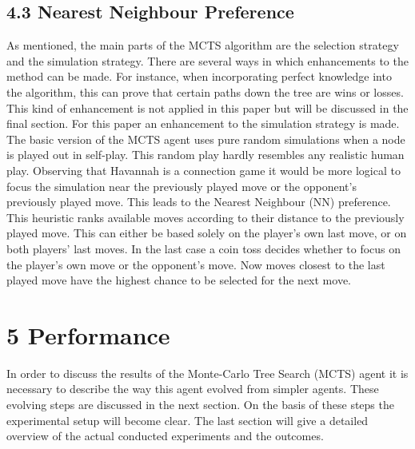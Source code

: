 \documentclass[10pt]{article}
\begin{document}
\subsection*{4.3 Nearest Neighbour Preference}
As mentioned, the main parts of the MCTS algorithm are the selection strategy and the simulation strategy. There are several ways in which enhancements to the method can be made. For instance, when incorporating perfect knowledge into the algorithm, this can prove that certain paths down the tree are wins or losses. This kind of enhancement is not applied in this paper but will be discussed in the final section. For this paper an enhancement to the simulation strategy is made. The basic version of the MCTS agent uses pure random simulations when a node is played out in self-play. This random play hardly resembles any realistic human play. Observing that Havannah is a connection game it would be more logical to focus the simulation near the previously played move or the opponent's previously played move. This leads to the Nearest Neighbour (NN) preference. This heuristic ranks available moves according to their distance to the previously played move. This can either be based solely on the player's own last move, or on both players' last moves. In the last case a coin toss decides whether to focus on the player's own move or the opponent's move. Now moves closest to the last played move have the highest chance to be selected for the next move.

\section*{5 Performance}
In order to discuss the results of the Monte-Carlo Tree Search (MCTS) agent it is necessary to describe the way this agent evolved from simpler agents. These evolving steps are discussed in the next section. On the basis of these steps the experimental setup will become clear. The last section will give a detailed overview of the actual conducted experiments and the outcomes.
\end{document}

